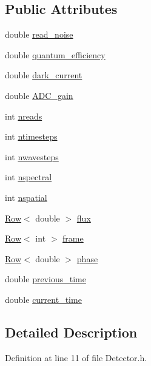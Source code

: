 \subsection*{Public Attributes}
\begin{DoxyCompactItemize}
\item 
double \hyperlink{classDetector_a8eca17062f19ec98b728af67752abf6f}{read\_\-noise}
\item 
double \hyperlink{classDetector_a4a830152b9beb393e26f8f2e26fda464}{quantum\_\-efficiency}
\item 
double \hyperlink{classDetector_a8c0b7234e4b96407d8648a42efec4371}{dark\_\-current}
\item 
double \hyperlink{classDetector_adb18913ba2480228ee13611040ad7bfe}{ADC\_\-gain}
\item 
int \hyperlink{classDetector_aab6efccaea99c3467b6e0082a7922cb8}{nreads}
\item 
int \hyperlink{classDetector_ada81397b9b56b728a7a6d20b48d40e2d}{ntimesteps}
\item 
int \hyperlink{classDetector_aa5e5de28e589cc3cee8ee535ba03d34a}{nwavesteps}
\item 
int \hyperlink{classDetector_a83edf838e8d00d2286e2e75f54836601}{nspectral}
\item 
int \hyperlink{classDetector_ad0d59d1328b59ce6c13f49361b50ac29}{nspatial}
\item 
\hyperlink{classRow}{Row}$<$ double $>$ \hyperlink{classDetector_ac6809aa9b8d5acee17ce16353599d557}{flux}
\item 
\hyperlink{classRow}{Row}$<$ int $>$ \hyperlink{classDetector_a5082e9a99cae04f03cba0223a0593053}{frame}
\item 
\hyperlink{classRow}{Row}$<$ double $>$ \hyperlink{classDetector_a434d34a6f28382fff13111fbb8c1b6a9}{phase}
\item 
double \hyperlink{classDetector_a2cb4ca9c009f4465404af3bd4d943788}{previous\_\-time}
\item 
double \hyperlink{classDetector_a7d1a73b930a0cdc646e9d5e7a75f28e7}{current\_\-time}
\end{DoxyCompactItemize}


\subsection{Detailed Description}


Definition at line 11 of file Detector.h.



